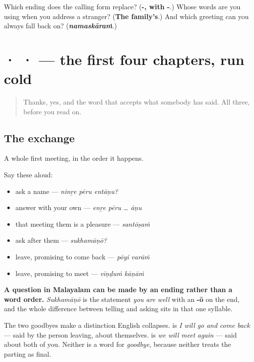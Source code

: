 \begin{tcolorbox}[breakable,colback=teal!4,colframe=teal!35!black,title={Before you move on}]
Which ending does the calling form replace? (\textbf{-, with -}.) Whose words are you using when you address a stranger? (\textbf{The family's}.) And which greeting can you always fall back on? (\emph{\textbf{namaskāraṁ}}.)
\end{tcolorbox}
\section[\texorpdfstring{\ml{നന്ദി} · \ml{ശരി} · \ml{അതെ} … (nandi · śari …)}{നന്ദി · ശരി · അതെ … (nandi · śari …)}]{ ·  ·  — the first four chapters, run cold}

\label{lesson:ML-R82-the-opening-second-pass}



\begin{quote}
Thanks, yes, and the word that accepts what somebody has said. All three, before you read on.
\end{quote}

\subsection*{The exchange}
A whole first meeting, in the order it happens.

Say these aloud:

\begin{itemize}
\raggedright
  \item ask a name — \emph{ninṟe pēru entāṇu?}
  \item answer with your own — \emph{enṟe pēru … āṇu}
  \item that meeting them is a pleasure — \emph{santōṣaṁ}
  \item ask after them — \emph{sukhamāṇō?}
  \item leave, promising to come back — \emph{pōyi varāṁ}
  \item leave, promising to meet — \emph{vīṇḍuṁ kāṇāṁ}
\end{itemize}

\begin{culture}
\textbf{A question in Malayalam can be made by an ending rather than a word order.} \emph{Sukhamāṇō} is the statement \emph{you are well} with an \textbf{-ō} on the end, and the whole difference between telling and asking sits in that one syllable.

The two goodbyes make a distinction English collapses. \textbf{ } is \emph{I will go and come back} — said by the person leaving, about themselves. \textbf{ } is \emph{we will meet again} — said about both of you. Neither is a word for \emph{goodbye}, because neither treats the parting as final.
\end{culture}

